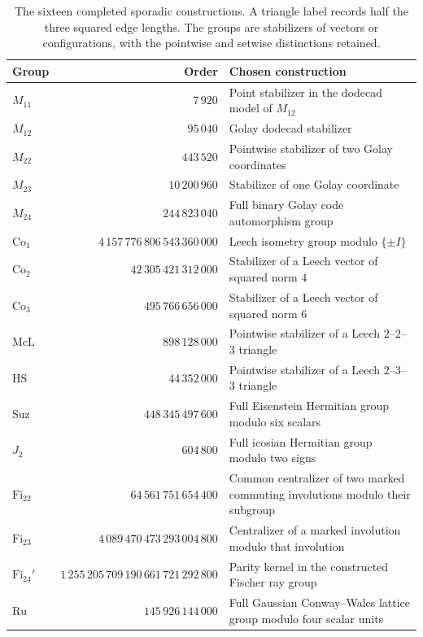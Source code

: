 \documentclass[11pt]{article}
\numberwithin{equation}{section}
\theoremstyle{definition}
\newcommand{\Co}{\mathrm{Co}}
\newcommand{\Fi}{\mathrm{Fi}}
\newcommand{\Suz}{\mathrm{Suz}}
\begin{document}
\begin{table}[!htbp]
\centering\small
\setlength{\tabcolsep}{5pt}
\begin{tabularx}{\textwidth}{@{}l r X@{}}
\toprule
Group & Order & Chosen construction\\
\midrule
$M_{11}$ & $7\,920$ & Point stabilizer in the dodecad model of $M_{12}$\\
$M_{12}$ & $95\,040$ & Golay dodecad stabilizer\\
$M_{22}$ & $443\,520$ & Pointwise stabilizer of two Golay coordinates\\
$M_{23}$ & $10\,200\,960$ & Stabilizer of one Golay coordinate\\
$M_{24}$ & $244\,823\,040$ & Full binary Golay code automorphism group\\
\addlinespace
$\Co_1$ & $4\,157\,776\,806\,543\,360\,000$ & Leech isometry group modulo $\{\pm I\}$\\
$\Co_2$ & $42\,305\,421\,312\,000$ & Stabilizer of a Leech vector of squared norm $4$\\
$\Co_3$ & $495\,766\,656\,000$ & Stabilizer of a Leech vector of squared norm $6$\\
$\mathrm{McL}$ & $898\,128\,000$ & Pointwise stabilizer of a Leech $2$--$2$--$3$ triangle\\
$\mathrm{HS}$ & $44\,352\,000$ & Pointwise stabilizer of a Leech $2$--$3$--$3$ triangle\\
\addlinespace
$\Suz$ & $448\,345\,497\,600$ & Full Eisenstein Hermitian group modulo six scalars\\
$J_2$ & $604\,800$ & Full icosian Hermitian group modulo two signs\\
\addlinespace
$\Fi_{22}$ & $64\,561\,751\,654\,400$ & Common centralizer of two marked commuting involutions modulo their subgroup\\
$\Fi_{23}$ & $4\,089\,470\,473\,293\,004\,800$ & Centralizer of a marked involution modulo that involution\\
$\Fi_{24}'$ & $1\,255\,205\,709\,190\,661\,721\,292\,800$ & Parity kernel in the constructed Fischer ray group\\
\addlinespace
$\mathrm{Ru}$ & $145\,926\,144\,000$ & Full Gaussian Conway--Wales lattice group modulo four scalar units\\
\bottomrule
\end{tabularx}
\caption{The sixteen completed sporadic constructions. A triangle label records half the three squared edge lengths.
The groups are stabilizers of vectors or configurations, with the
pointwise and setwise distinctions retained.}
\label{tab:sporadic}
\end{table}
\end{document}
